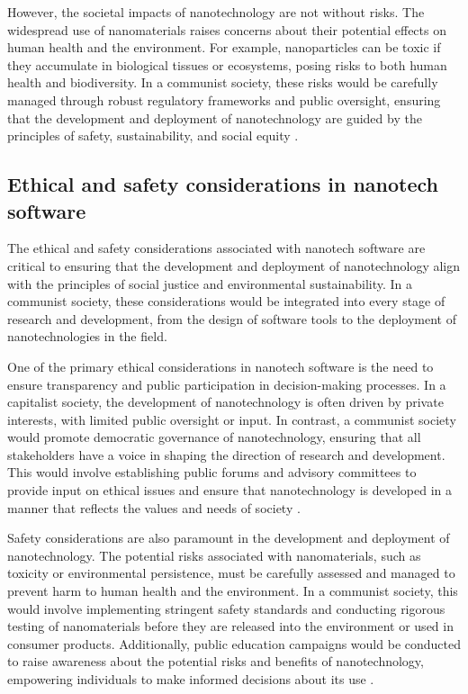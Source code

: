 However, the societal impacts of nanotechnology are not without risks. The widespread use of nanomaterials raises concerns about their potential effects on human health and the environment. For example, nanoparticles can be toxic if they accumulate in biological tissues or ecosystems, posing risks to both human health and biodiversity. In a communist society, these risks would be carefully managed through robust regulatory frameworks and public oversight, ensuring that the development and deployment of nanotechnology are guided by the principles of safety, sustainability, and social equity \cite[pp.~335-342]{freitas1999nanomedicine}.

\subsection{Ethical and safety considerations in nanotech software}

The ethical and safety considerations associated with nanotech software are critical to ensuring that the development and deployment of nanotechnology align with the principles of social justice and environmental sustainability. In a communist society, these considerations would be integrated into every stage of research and development, from the design of software tools to the deployment of nanotechnologies in the field.

One of the primary ethical considerations in nanotech software is the need to ensure transparency and public participation in decision-making processes. In a capitalist society, the development of nanotechnology is often driven by private interests, with limited public oversight or input. In contrast, a communist society would promote democratic governance of nanotechnology, ensuring that all stakeholders have a voice in shaping the direction of research and development. This would involve establishing public forums and advisory committees to provide input on ethical issues and ensure that nanotechnology is developed in a manner that reflects the values and needs of society \cite[pp.~380-387]{ratner2003nanotechnology}.

Safety considerations are also paramount in the development and deployment of nanotechnology. The potential risks associated with nanomaterials, such as toxicity or environmental persistence, must be carefully assessed and managed to prevent harm to human health and the environment. In a communist society, this would involve implementing stringent safety standards and conducting rigorous testing of nanomaterials before they are released into the environment or used in consumer products. Additionally, public education campaigns would be conducted to raise awareness about the potential risks and benefits of nanotechnology, empowering individuals to make informed decisions about its use \cite[pp.~410-417]{meyer2004nanotechnology}.

